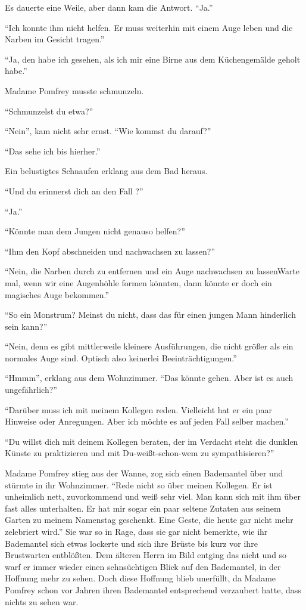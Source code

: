 Es dauerte eine Weile, aber dann kam die Antwort. \enquote{Ja.}

\enquote{Ich konnte ihm nicht helfen. Er muss weiterhin mit einem Auge leben und die Narben im Gesicht tragen.}

\enquote{Ja, den habe ich gesehen, als ich mir eine Birne aus dem Küchengemälde geholt habe.}

Madame Pomfrey musste schmunzeln.

\enquote{Schmunzelst du etwa?}

\enquote{Nein}, kam nicht sehr ernst. \enquote{Wie kommst du darauf?}

\enquote{Das sehe ich bis hierher.}

Ein belustigtes Schnaufen erklang aus dem Bad heraus.

\enquote{Und du erinnerst dich an den Fall ?}

\enquote{Ja.}

\enquote{Könnte man dem Jungen nicht genauso helfen?}

\enquote{Ihm den Kopf abschneiden und nachwachsen zu lassen?}

\enquote{Nein, die Narben durch  zu entfernen und ein Auge nachwachsen zu lassen\abs Warte mal, wenn wir eine Augenhöhle formen könnten, dann könnte er doch ein magisches Auge bekommen.}

\enquote{So ein Monstrum? Meinst du nicht, dass das für einen jungen Mann hinderlich sein kann?}

\enquote{Nein, denn es gibt mittlerweile kleinere Ausführungen, die nicht größer als ein normales Auge sind. Optisch also keinerlei Beeinträchtigungen.}

\enquote{Hmmm}, erklang aus dem Wohnzimmer. \enquote{Das könnte gehen. Aber ist es auch ungefährlich?}

\enquote{Darüber muss ich mit meinem Kollegen reden. Vielleicht hat er ein paar Hinweise oder Anregungen. Aber ich möchte es auf jeden Fall selber machen.}

\enquote{Du willst dich mit deinem Kollegen beraten, der im Verdacht steht die dunklen Künste zu praktizieren und mit Du-weißt-schon-wem zu sympathisieren?}

Madame Pomfrey stieg aus der Wanne, zog sich einen Bademantel über und stürmte in ihr Wohnzimmer. \enquote{Rede nicht so über meinen Kollegen. Er ist unheimlich nett, zuvorkommend und weiß sehr viel. Man kann sich mit ihm über fast alles unterhalten. Er hat mir sogar ein paar seltene Zutaten aus seinem Garten zu meinem Namenstag geschenkt. Eine Geste, die heute gar nicht mehr zelebriert wird.} Sie war so in Rage, dass sie gar nicht bemerkte, wie ihr Bademantel sich etwas lockerte und sich ihre Brüste bis kurz vor ihre Brustwarten entblößten. Dem älteren Herrn im Bild entging das nicht und so warf er immer wieder einen sehnsüchtigen Blick auf den Bademantel, in der Hoffnung mehr zu sehen. Doch diese Hoffnung blieb unerfüllt, da Madame Pomfrey schon vor Jahren ihren Bademantel entsprechend verzaubert hatte, dass nichts zu sehen war.

